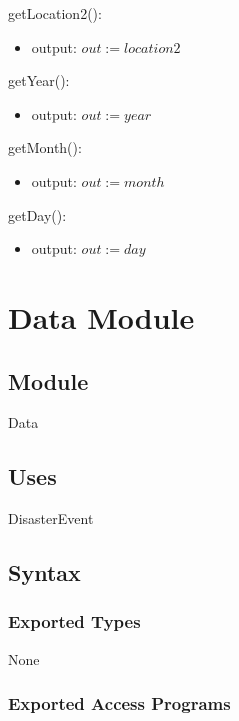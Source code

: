 \documentclass[12pt]{article}
\begin{document}
\noindent getLocation2():
\begin{itemize}
\item output: $out := location2$
\end{itemize}

\noindent getYear():
\begin{itemize}
\item output: $out := year$
\end{itemize}

\noindent getMonth():
\begin{itemize}
\item output: $out := month$
\end{itemize}

\noindent getDay():
\begin{itemize}
\item output: $out := day$
\end{itemize}

\newpage





\section {Data Module}

\subsection {Module}

Data

\subsection {Uses}

DisasterEvent

\subsection {Syntax}

\subsubsection {Exported Types}

None

\subsubsection {Exported Access Programs}
\end{document}
